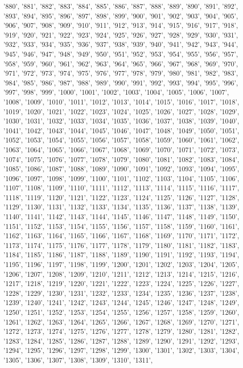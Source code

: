 '880', '881', '882', '883', '884', '885', '886', '887', '888', '889', '890', '891', '892', '893', '894', '895', '896', '897', '898', '899', '900', '901', '902', '903', '904', '905', '906', '907', '908', '909', '910', '911', '912', '913', '914', '915', '916', '917', '918', '919', '920', '921', '922', '923', '924', '925', '926', '927', '928', '929', '930', '931', '932', '933', '934', '935', '936', '937', '938', '939', '940', '941', '942', '943', '944', '945', '946', '947', '948', '949', '950', '951', '952', '953', '954', '955', '956', '957', '958', '959', '960', '961', '962', '963', '964', '965', '966', '967', '968', '969', '970', '971', '972', '973', '974', '975', '976', '977', '978', '979', '980', '981', '982', '983', '984', '985', '986', '987', '988', '989', '990', '991', '992', '993', '994', '995', '996', '997', '998', '999', '1000', '1001', '1002', '1003', '1004', '1005', '1006', '1007', '1008', '1009', '1010', '1011', '1012', '1013', '1014', '1015', '1016', '1017', '1018', '1019', '1020', '1021', '1022', '1023', '1024', '1025', '1026', '1027', '1028', '1029', '1030', '1031', '1032', '1033', '1034', '1035', '1036', '1037', '1038', '1039', '1040', '1041', '1042', '1043', '1044', '1045', '1046', '1047', '1048', '1049', '1050', '1051', '1052', '1053', '1054', '1055', '1056', '1057', '1058', '1059', '1060', '1061', '1062', '1063', '1064', '1065', '1066', '1067', '1068', '1069', '1070', '1071', '1072', '1073', '1074', '1075', '1076', '1077', '1078', '1079', '1080', '1081', '1082', '1083', '1084', '1085', '1086', '1087', '1088', '1089', '1090', '1091', '1092', '1093', '1094', '1095', '1096', '1097', '1098', '1099', '1100', '1101', '1102', '1103', '1104', '1105', '1106', '1107', '1108', '1109', '1110', '1111', '1112', '1113', '1114', '1115', '1116', '1117', '1118', '1119', '1120', '1121', '1122', '1123', '1124', '1125', '1126', '1127', '1128', '1129', '1130', '1131', '1132', '1133', '1134', '1135', '1136', '1137', '1138', '1139', '1140', '1141', '1142', '1143', '1144', '1145', '1146', '1147', '1148', '1149', '1150', '1151', '1152', '1153', '1154', '1155', '1156', '1157', '1158', '1159', '1160', '1161', '1162', '1163', '1164', '1165', '1166', '1167', '1168', '1169', '1170', '1171', '1172', '1173', '1174', '1175', '1176', '1177', '1178', '1179', '1180', '1181', '1182', '1183', '1184', '1185', '1186', '1187', '1188', '1189', '1190', '1191', '1192', '1193', '1194', '1195', '1196', '1197', '1198', '1199', '1200', '1201', '1202', '1203', '1204', '1205', '1206', '1207', '1208', '1209', '1210', '1211', '1212', '1213', '1214', '1215', '1216', '1217', '1218', '1219', '1220', '1221', '1222', '1223', '1224', '1225', '1226', '1227', '1228', '1229', '1230', '1231', '1232', '1233', '1234', '1235', '1236', '1237', '1238', '1239', '1240', '1241', '1242', '1243', '1244', '1245', '1246', '1247', '1248', '1249', '1250', '1251', '1252', '1253', '1254', '1255', '1256', '1257', '1258', '1259', '1260', '1261', '1262', '1263', '1264', '1265', '1266', '1267', '1268', '1269', '1270', '1271', '1272', '1273', '1274', '1275', '1276', '1277', '1278', '1279', '1280', '1281', '1282', '1283', '1284', '1285', '1286', '1287', '1288', '1289', '1290', '1291', '1292', '1293', '1294', '1295', '1296', '1297', '1298', '1299', '1300', '1301', '1302', '1303', '1304', '1305', '1306', '1307', '1308', '1309', '1310', '1311', 